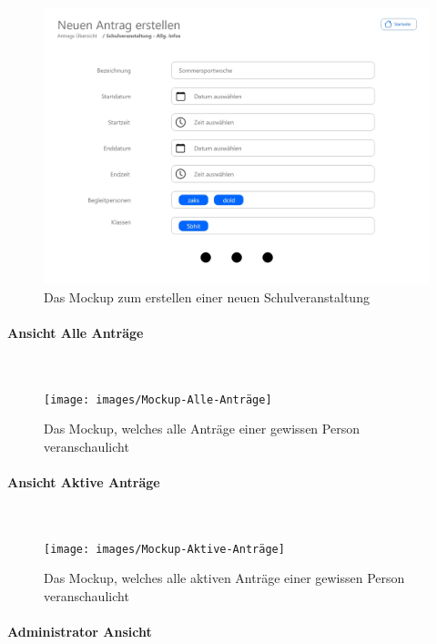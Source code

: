 \begin{figure}[H]
	\centering
	\includegraphics[width=1\linewidth]{images/Mockup-Antrag-erstellen}
	\caption[Mockup Antrag erstellen]{Das Mockup zum erstellen einer neuen Schulveranstaltung}
	\label{fig:mockupErstellen}
\end{figure}
\paragraph{Ansicht Alle Anträge}
~\\

\begin{figure}[H]
	\centering
	\texttt{[image: images/Mockup-Alle-Anträge]}
	\caption[Mockup Alle Anträge]{Das Mockup, welches alle Anträge einer gewissen Person veranschaulicht}
	\label{fig:mockupAlle}
\end{figure}
\paragraph{Ansicht Aktive Anträge}
~\\

\begin{figure}[H]
	\centering
	\texttt{[image: images/Mockup-Aktive-Anträge]}
	\caption[Mokup aktive Anträge]{Das Mockup, welches alle aktiven Anträge einer gewissen Person veranschaulicht}
	\label{fig:mockupAktive}
\end{figure}
\paragraph{Administrator Ansicht}
~\\

